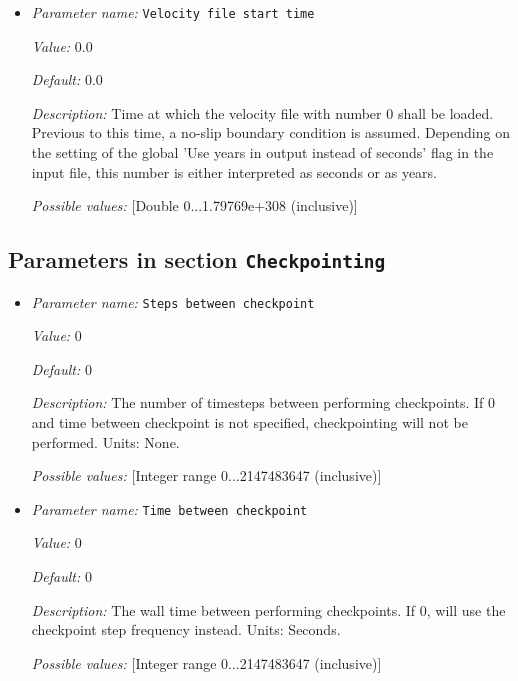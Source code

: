 \begin{itemize}
{\it Default:} phi.%


{\it Description:} The file name of the material data. Provide file in format: (Velocity file name).\%d.gpml where \%d is any sprintf integer qualifier, specifying the format of the current file number.


{\it Possible values:} [Anything]
\item {\it Parameter name:} {\tt Velocity file start time}
\label{parameters:Boundary velocity model/GPlates model/Velocity file start time}


{\it Value:} 0.0


{\it Default:} 0.0


{\it Description:} Time at which the velocity file with number 0 shall be loaded. Previous to this time, a no-slip boundary condition is assumed. Depending on the setting of the global 'Use years in output instead of seconds' flag in the input file, this number is either interpreted as seconds or as years.


{\it Possible values:} [Double 0...1.79769e+308 (inclusive)]
\end{itemize}

\subsection{Parameters in section \tt Checkpointing}
\label{parameters:Checkpointing}

\begin{itemize}
\item {\it Parameter name:} {\tt Steps between checkpoint}
\label{parameters:Checkpointing/Steps between checkpoint}


{\it Value:} 0


{\it Default:} 0


{\it Description:} The number of timesteps between performing checkpoints. If 0 and time between checkpoint is not specified, checkpointing will not be performed. Units: None.


{\it Possible values:} [Integer range 0...2147483647 (inclusive)]
\item {\it Parameter name:} {\tt Time between checkpoint}
\label{parameters:Checkpointing/Time between checkpoint}


{\it Value:} 0


{\it Default:} 0


{\it Description:} The wall time between performing checkpoints. If 0, will use the checkpoint step frequency instead. Units: Seconds.


{\it Possible values:} [Integer range 0...2147483647 (inclusive)]
\end{itemize}

